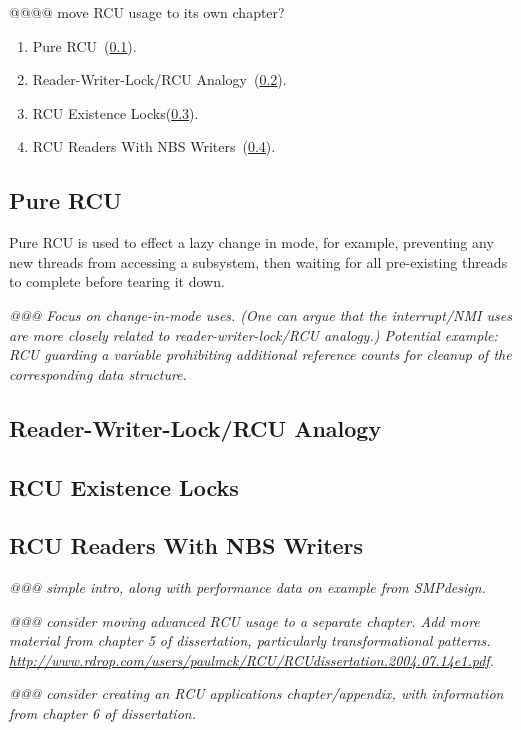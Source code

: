@@@@ move RCU usage to its own chapter?

\begin{enumerate}
\item	Pure RCU~(\ref{sec:advsync:Pure RCU}).
\item	Reader-Writer-Lock/RCU
        Analogy~(\ref{sec:advsync:Reader-Writer-Lock/RCU Analogy}).
\item	RCU Existence Locks(\ref{sec:advsync:RCU Existence Locks}).
\item	RCU Readers With NBS
	Writers~(\ref{sec:advsync:RCU Readers With NBS Writers}).
\end{enumerate}

\subsection{Pure RCU}
\label{sec:advsync:Pure RCU}

Pure RCU is used to effect a lazy change in mode, for example, preventing
any new threads from accessing a subsystem, then waiting for all
pre-existing threads to complete before tearing it down.

\emph{@@@ Focus on change-in-mode uses.  (One can argue that the interrupt/NMI
uses are more closely related to reader-writer-lock/RCU analogy.)
Potential example: RCU guarding a variable prohibiting additional reference
counts for cleanup of the corresponding data structure.}

\subsection{Reader-Writer-Lock/RCU Analogy}
\label{sec:advsync:Reader-Writer-Lock/RCU Analogy}

\subsection{RCU Existence Locks}
\label{sec:advsync:RCU Existence Locks}

\subsection{RCU Readers With NBS Writers}
\label{sec:advsync:RCU Readers With NBS Writers}

\emph{@@@ simple intro, along with performance data on example from SMPdesign.}

\emph{@@@ consider moving advanced RCU usage to a separate chapter.
Add more material from chapter 5 of dissertation, particularly transformational
patterns.
\url{http://www.rdrop.com/users/paulmck/RCU/RCUdissertation.2004.07.14e1.pdf}.}

\emph{@@@ consider creating an RCU applications chapter/appendix, with
information from chapter 6 of dissertation.}
